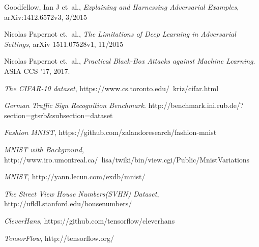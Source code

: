\documentclass{article}
\begin{document}
\begin{thebibliography}{9}
\raggedright
{}
    Goodfellow, Ian J et\ al.,
    \emph{Explaining and Harnessing Adversarial Examples},	
    arXiv:1412.6572v3,
    3/2015

    Nicolas Papernot et.\ al.,
   \emph{The Limitations of Deep Learning in Adversarial Settings},
    arXiv 1511.07528v1,
    11/2015

    Nicolas Papernot et.\ al.,
    \emph{Practical Black-Box Attacks against Machine Learning}.
    ASIA CCS '17,
    2017.

    \emph{The CIFAR-10 dataset},
    https://www.cs.toronto.edu/~kriz/cifar.html

    \emph{German Traffic Sign Recognition Benchmark}.
    http://benchmark.ini.rub.de/?section=gtsrb\&subsection=dataset

    \emph{Fashion MNIST},
    https://github.com/zalandoresearch/fashion-mnist

    \emph{MNIST with Background},
    http://www.iro.umontreal.ca/~lisa/twiki/bin/view.cgi/Public/MnistVariations

    \emph{MNIST},
    http://yann.lecun.com/exdb/mnist/

    \emph{The Street View House Numbers(SVHN) Dataset},
    http://ufldl.stanford.edu/housenumbers/

    \emph{CleverHans},
    https://github.com/tensorflow/cleverhans

    \emph{TensorFlow},
    http://tensorflow.org/

\end{thebibliography}
\end{document}

